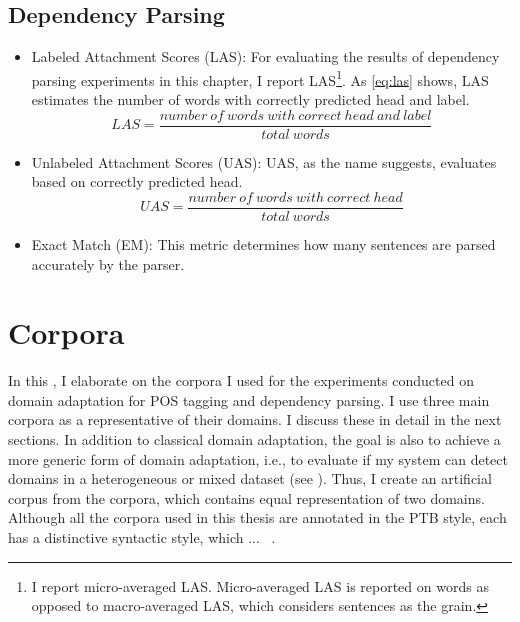 \subsection{Dependency Parsing}
    \begin{itemize}
        \item Labeled Attachment Scores (LAS): For evaluating the results of dependency parsing experiments in this chapter, I report LAS\footnote{I report micro-averaged LAS. Micro-averaged LAS is reported on words as opposed to macro-averaged LAS, which considers sentences as the grain.}.  As \ref{eq:las} shows, LAS estimates the number of words with correctly predicted head and label.
        \begin{equation} \label{eq:las}
            LAS = \frac{number\ of\ words\ with\ correct\ head\ and\ label}{total\ words}
        \end{equation}
        
        \item Unlabeled Attachment Scores (UAS): UAS, as the name suggests, evaluates based on correctly predicted head. 
        \begin{equation} \label{eq:uas}
            UAS = \frac{number\ of\ words\ with\ correct\ head}{total\ words}
        \end{equation}
        
        \item Exact Match (EM): This metric determines how many sentences are parsed accurately by the parser.
        
    \end{itemize}


\section{Corpora}

In this , I elaborate on the corpora I used for the experiments conducted on domain adaptation for POS tagging and dependency parsing. I use three main corpora as a representative of their domains. I discuss these in detail in the next sections. In addition to classical domain adaptation, the goal is also to achieve a more generic form of domain adaptation, i.e., to evaluate if my system can detect domains in a heterogeneous or mixed dataset (see ). Thus, I create an artificial corpus from the corpora, which contains equal representation of two domains. Although all the corpora used in this thesis are annotated in the PTB style, each has a distinctive syntactic style, which ... ~.

